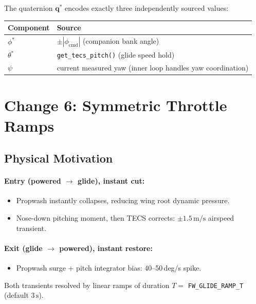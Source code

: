 \documentclass[12pt,a4paper]{article}
\begin{document}
The quaternion $\mathbf{q}^*$ encodes exactly three independently sourced values:
\begin{center}
\begin{tabular}{ll}
\toprule
Component & Source \\
\midrule
$\phi^*$ & $\pm|\phi_{\text{cmd}}|$ (companion bank angle) \\
$\theta^*$ & \texttt{get\_tecs\_pitch()} (glide speed hold) \\
$\psi$ & current measured yaw (inner loop handles yaw coordination) \\
\bottomrule
\end{tabular}
\end{center}

\section{Change 6: Symmetric Throttle Ramps}

\subsection{Physical Motivation}

\paragraph{Entry (powered $\to$ glide), instant cut:}
\begin{itemize}
  \item Propwash instantly collapses, reducing wing root dynamic pressure.
  \item Nose-down pitching moment, then TECS corrects: $\pm 1.5\,\text{m/s}$
        airspeed transient.
\end{itemize}

\paragraph{Exit (glide $\to$ powered), instant restore:}
\begin{itemize}
  \item Propwash surge + pitch integrator bias: 40--50\,deg/s spike.
\end{itemize}

Both transients resolved by linear ramps of duration
$T = $ \texttt{FW\_GLIDE\_RAMP\_T} (default $3\,\text{s}$).
\end{document}
